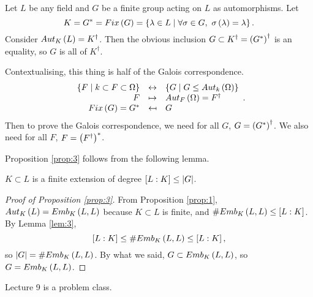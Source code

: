 \begin{proposition}
\label{prop:3}
Let $ L $ be any field and $ G $ be a finite group acting on $ L $ as automorphisms. Let
$$ K = G^* = Fix\left( G \right) = \left\{ \lambda \in L \mid \forall \sigma \in G, \ \sigma\left( \lambda \right) = \lambda \right\}. $$
Consider $ Aut_K\left( L \right) = K^\dagger $. Then the obvious inclusion $ G \subset K^\dagger = \left( G^* \right)^\dagger $ is an equality, so $ G $ is all of $ K^\dagger $.
\end{proposition}

\begin{remark*}
Contextualising, this thing is half of the Galois correspondence.
$$
\begin{array}{rcl}
\left\{ F \mid k \subset F \subset \Omega \right\} & \leftrightarrow & \left\{ G \mid G \le Aut_k\left( \Omega \right) \right\} \\
F & \mapsto & Aut_F\left( \Omega \right) = F^\dagger \\
Fix\left( G \right) = G^* & \mapsfrom & G
\end{array}.
$$
Then to prove the Galois correspondence, we need for all $ G $, $ G = \left( G^* \right)^\dagger $. We also need for all $ F $, $ F = \left( F^\dagger \right)^* $.
\end{remark*}

Proposition \ref{prop:3} follows from the following lemma.

\begin{lemma}
\label{lem:3}
$ K \subset L $ is a finite extension of degree $ \left[ L : K \right] \le \left\lvert G \right\rvert $.
\end{lemma}

\begin{proof}[Proof of Proposition \ref{prop:3}]
From Proposition \ref{prop:1}, $ Aut_K\left( L \right) = Emb_K\left( L, L \right) $ because $ K \subset L $ is finite, and $ \#Emb_K\left( L, L \right) \le \left[ L : K \right] $. By Lemma \ref{lem:3},
$$ \left[ L : K \right] \le \#Emb_K\left( L, L \right) \le \left[ L : K \right], $$
so $ \left\lvert G \right\rvert = \#Emb_K\left( L, L \right) $. By what we said, $ G \subset Emb_K\left( L, L \right) $, so $ G = Emb_K\left( L, L \right) $.
\end{proof}


Lecture 9 is a problem class.

